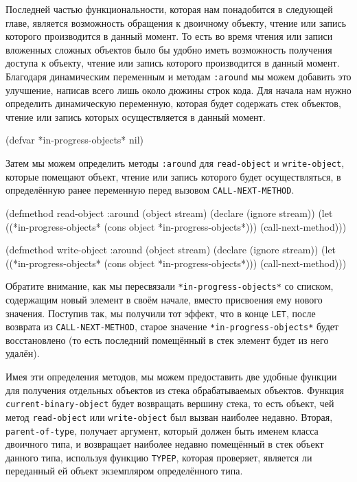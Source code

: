 Последней частью функциональности, которая нам понадобится в следующей главе, является
возможность обращения к двоичному объекту, чтение или запись которого производится в
данный момент. То есть во время чтения или записи вложенных сложных объектов было бы
удобно иметь возможность получения доступа к объекту, чтение или запись которого
производится в данный момент. Благодаря динамическим переменным и методам \lstinline{:around}
мы можем добавить это улучшение, написав всего лишь около дюжины строк кода. Для начала
нам нужно определить динамическую переменную, которая будет содержать стек объектов,
чтение или запись которых осуществляется в данный момент.

\begin{myverb}
(defvar *in-progress-objects* nil)
\end{myverb}

Затем мы можем определить методы \lstinline{:around} для \lstinline{read-object} и
\lstinline{write-object}, которые помещают объект, чтение или запись которого будет
осуществляться, в определённую ранее переменную перед вызовом \lstinline{CALL-NEXT-METHOD}.

\begin{myverb}
(defmethod read-object :around (object stream)
  (declare (ignore stream))
  (let ((*in-progress-objects* (cons object *in-progress-objects*)))
    (call-next-method)))

(defmethod write-object :around (object stream)
  (declare (ignore stream))
  (let ((*in-progress-objects* (cons object *in-progress-objects*)))
    (call-next-method)))
\end{myverb}

Обратите внимание, как мы пересвязали \lstinline{*in-progress-objects*} со списком, содержащим
новый элемент в своём начале, вместо присвоения ему нового значения. Поступив так, мы
получили тот эффект, что в конце \lstinline{LET}, после возврата из
\lstinline{CALL-NEXT-METHOD}, старое значение \lstinline{*in-progress-objects*} будет
восстановлено (то есть последний помещённый в стек элемент будет из него удалён).

Имея эти определения методов, мы можем предоставить две удобные функции для получения
отдельных объектов из стека обрабатываемых объектов. Функция \lstinline{current-binary-object}
будет возвращать вершину стека, то есть объект, чей метод \lstinline{read-object} или
\lstinline{write-object} был вызван наиболее недавно. Вторая, \lstinline{parent-of-type}, получает
аргумент, который должен быть именем класса двоичного типа, и возвращает наиболее недавно
помещённый в стек объект данного типа, используя функцию \lstinline{TYPEP}, которая
проверяет, является ли переданный ей объект экземпляром определённого типа.

